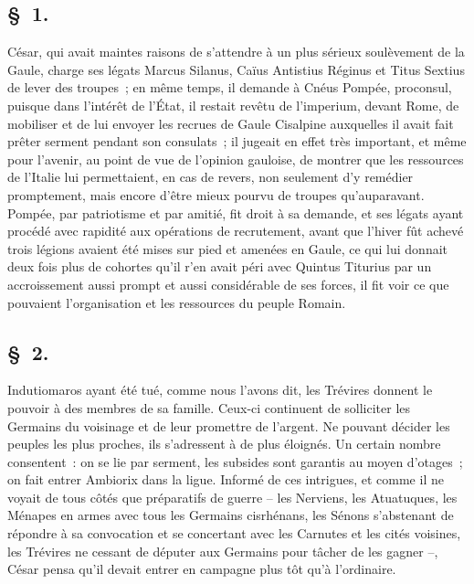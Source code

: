 \documentclass[french,twoside]{book} %
\begin{document}
\subsection[{§ 1.}]{ \textsc{§ 1.} }
\noindent César, qui avait maintes raisons de s’attendre à un plus sérieux soulèvement de la Gaule, charge ses légats Marcus Silanus, Caïus Antistius Réginus et Titus Sextius de lever des troupes ; en même temps, il demande à Cnéus Pompée, proconsul, puisque dans l’intérêt de l’État, il restait revêtu de l’imperium, devant Rome, de mobiliser et de lui envoyer les recrues de Gaule Cisalpine auxquelles il avait fait prêter serment pendant son consulats ; il jugeait en effet très important, et même pour l’avenir, au point de vue de l’opinion gauloise, de montrer que les ressources de l’Italie lui permettaient, en cas de revers, non seulement d’y remédier promptement, mais encore d’être mieux pourvu de troupes qu’auparavant. Pompée, par patriotisme et par amitié, fit droit à sa demande, et ses légats ayant procédé avec rapidité aux opérations de recrutement, avant que l’hiver fût achevé trois légions avaient été mises sur pied et amenées en Gaule, ce qui lui donnait deux fois plus de cohortes qu’il r'en avait péri avec Quintus Titurius par un accroissement aussi prompt et aussi considérable de ses forces, il fit voir ce que pouvaient l’organisation et les ressources du peuple Romain.
\subsection[{§ 2.}]{ \textsc{§ 2.} }
\noindent Indutiomaros ayant été tué, comme nous l’avons dit, les Trévires donnent le pouvoir à des membres de sa famille. Ceux-ci continuent de solliciter les Germains du voisinage et de leur promettre de l’argent. Ne pouvant décider les peuples les plus proches, ils s’adressent à de plus éloignés. Un certain nombre consentent : on se lie par serment, les subsides sont garantis au moyen d’otages ; on fait entrer Ambiorix dans la ligue. Informé de ces intrigues, et comme il ne voyait de tous côtés que préparatifs de guerre – les Nerviens, les Atuatuques, les Ménapes en armes avec tous les Germains cisrhénans, les Sénons s’abstenant de répondre à sa convocation et se concertant avec les Carnutes et les cités voisines, les Trévires ne cessant de députer aux Germains pour tâcher de les gagner –, César pensa qu’il devait entrer en campagne plus tôt qu’à l’ordinaire.
\end{document}

